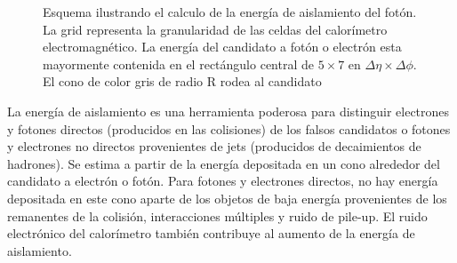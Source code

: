 








\begin{figure}[!htbp]
  \centering

  \resizebox{0.5\textwidth}{!}{
    
  }

  \caption{Esquema ilustrando el calculo de la energía de aislamiento del fotón. La grid representa
    la granularidad de las celdas del calorímetro electromagnético. La energía del candidato a fotón o electrón
    esta mayormente contenida en el rectángulo central de $5 \times 7$ en $\Delta\eta \times \Delta\phi$. El
    cono de color gris de radio R rodea al candidato}
  \label{fig:topoetcone}

\end{figure}


La energía de aislamiento es una herramienta poderosa para distinguir electrones
y fotones directos (producidos en las colisiones) de los falsos candidatos o
fotones y electrones no directos provenientes de jets (producidos de
decaimientos de hadrones). Se estima a partir de la energía depositada en un
cono alrededor del candidato a electrón o fotón. Para fotones y electrones
directos, no hay energía depositada en este cono aparte de los objetos de baja
energía provenientes de los remanentes de la colisión, interacciones múltiples y
ruido de pile-up. El ruido electrónico del calorímetro también contribuye al
aumento de la energía de aislamiento.

